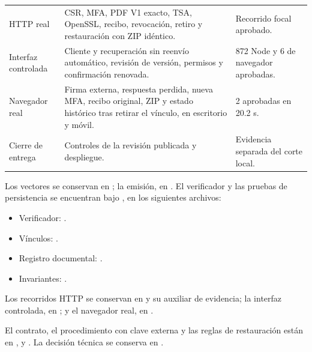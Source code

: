 \begin{longtable}{@{}L{2.7cm} L{7.2cm} L{3.1cm}@{}}
  HTTP real & CSR, MFA, PDF V1 exacto, TSA, OpenSSL, recibo, revocación, retiro y restauración con ZIP idéntico. & Recorrido focal aprobado. \\
  \addlinespace
  Interfaz controlada & Cliente y recuperación sin reenvío automático, revisión de versión, permisos y confirmación renovada. & 872 Node y 6 de navegador aprobadas. \\
  \addlinespace
  Navegador real & Firma externa, respuesta perdida, nueva MFA, recibo original, ZIP y estado histórico tras retirar el vínculo, en escritorio y móvil. & 2 aprobadas en 20.2 s. \\
  \addlinespace
  Cierre de entrega & Controles de la revisión publicada y despliegue. & Evidencia separada del corte local. \\
\end{longtable}

{\raggedright
Los vectores se conservan en
; la emisión, en
.
El verificador y las pruebas de persistencia se encuentran bajo
, en los siguientes archivos:
\begin{itemize}
  \item Verificador: .
  \item Vínculos: .
  \item Registro documental: .
  \item Invariantes: .
\end{itemize}
Los recorridos HTTP se conservan en
 y su auxiliar de evidencia;
la interfaz controlada, en
; y el navegador real,
en .
\par}

El contrato, el procedimiento con clave externa y las reglas de restauración
están en ,
 y
. La decisión técnica se conserva en
.
